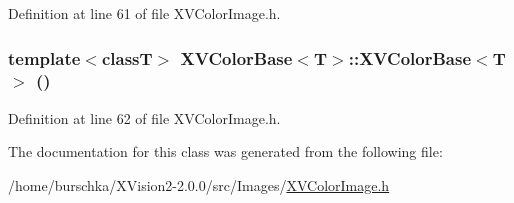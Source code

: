 Definition at line 61 of file XVColor\-Image.h.\label{XVColorBase_a5}
\hypertarget{class_XVColorBase_a5}{
\subsubsection[XVColorBase]{\setlength{\rightskip}{0pt plus 5cm}template$<$classT$>$ XVColor\-Base$<$T$>$::XVColor\-Base$<$T$>$ ()}}




Definition at line 62 of file XVColor\-Image.h.

The documentation for this class was generated from the following file:\begin{CompactItemize}
\item 
/home/burschka/XVision2-2.0.0/src/Images/\hyperlink{XVColorImage.h-source}{XVColor\-Image.h}\end{CompactItemize}
